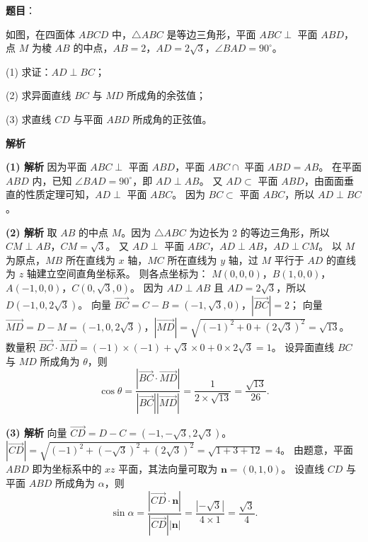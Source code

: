 \begin{answer}

\textbf{题目}：

如图，在四面体 $ABCD$ 中，$\triangle ABC$ 是等边三角形，平面 $ABC\perp$ 平面 $ABD$，点 $M$ 为棱 $AB$ 的中点，$AB=2$，$AD=2\sqrt3$，$\angle BAD=90^\circ$。
\nopagebreak[4]
\begin{center}\end{center}
\nopagebreak[4]
(1) 求证：$AD\perp BC$；

(2) 求异面直线 $BC$ 与 $MD$ 所成角的余弦值；

(3) 求直线 $CD$ 与平面 $ABD$ 所成角的正弦值。

\textbf{解析}

\textbf{(1) 解析} 因为平面 $ABC\perp$ 平面 $ABD$，平面 $ABC\cap$ 平面 $ABD=AB$。
在平面 $ABD$ 内，已知 $\angle BAD=90^\circ$，即 $AD\perp AB$。
又 $AD\subset$ 平面 $ABD$，由面面垂直的性质定理可知，$AD\perp$ 平面 $ABC$。
因为 $BC\subset$ 平面 $ABC$，所以 $AD\perp BC$。

\textbf{(2) 解析} 取 $AB$ 的中点 $M$。因为 $\triangle ABC$ 为边长为 2 的等边三角形，所以 $CM\perp AB$，$CM=\sqrt3$。
又 $AD\perp$ 平面 $ABC$，$AD\perp AB$，$AD\perp CM$。
以 $M$ 为原点，$MB$ 所在直线为 $x$ 轴，$MC$ 所在直线为 $y$ 轴，过 $M$ 平行于 $AD$ 的直线为 $z$ 轴建立空间直角坐标系。
则各点坐标为：
$M(0,0,0)$，$B(1,0,0)$，$A(-1,0,0)$，$C(0,\sqrt3,0)$。
因为 $AD\perp AB$ 且 $AD=2\sqrt3$，所以 $D(-1,0,2\sqrt3)$。
向量 $\overrightarrow{BC}=C-B=(-1,\sqrt3,0)$，$|\overrightarrow{BC}|=2$；
向量 $\overrightarrow{MD}=D-M=(-1,0,2\sqrt3)$，$|\overrightarrow{MD}|=\sqrt{(-1)^2+0+(2\sqrt3)^2}=\sqrt{13}$。
数量积 $\overrightarrow{BC}\cdot\overrightarrow{MD}=(-1)\times(-1)+\sqrt3\times 0+0\times 2\sqrt3=1$。
设异面直线 $BC$ 与 $MD$ 所成角为 $\theta$，则
\nopagebreak[4]
\[\cos\theta=\frac{|\overrightarrow{BC}\cdot\overrightarrow{MD}|}{|\overrightarrow{BC}||\overrightarrow{MD}|}=\frac{1}{2\times\sqrt{13}}=\frac{\sqrt{13}}{26}.\]

\textbf{(3) 解析} 向量 $\overrightarrow{CD}=D-C=(-1,-\sqrt3,2\sqrt3)$。
$|\overrightarrow{CD}|=\sqrt{(-1)^2+(-\sqrt3)^2+(2\sqrt3)^2}=\sqrt{1+3+12}=4$。
由题意，平面 $ABD$ 即为坐标系中的 $xz$ 平面，其法向量可取为 $\boldsymbol n=(0,1,0)$。
设直线 $CD$ 与平面 $ABD$ 所成角为 $\alpha$，则
\nopagebreak[4]
\[\sin\alpha=\frac{|\overrightarrow{CD}\cdot\boldsymbol n|}{|\overrightarrow{CD}||\boldsymbol n|}=\frac{|-\sqrt3|}{4\times 1}=\frac{\sqrt3}{4}.\]




\end{answer}
